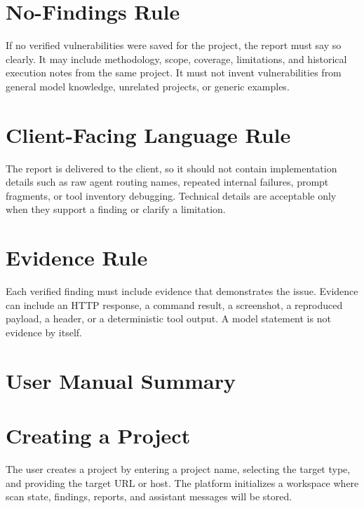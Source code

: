 \documentclass[12pt,a4paper]{report}
\begin{document}
\section*{No-Findings Rule}

If no verified vulnerabilities were saved for the project, the report must say so
clearly. It may include methodology, scope, coverage, limitations, and historical
execution notes from the same project. It must not invent vulnerabilities from general
model knowledge, unrelated projects, or generic examples.

\section*{Client-Facing Language Rule}

The report is delivered to the client, so it should not contain implementation details
such as raw agent routing names, repeated internal failures, prompt fragments, or tool
inventory debugging. Technical details are acceptable only when they support a finding
or clarify a limitation.

\section*{Evidence Rule}

Each verified finding must include evidence that demonstrates the issue. Evidence can
include an HTTP response, a command result, a screenshot, a reproduced payload, a header,
or a deterministic tool output. A model statement is not evidence by itself.

\newpage
\section{User Manual Summary}

\section*{Creating a Project}

The user creates a project by entering a project name, selecting the target type, and
providing the target URL or host. The platform initializes a workspace where scan
state, findings, reports, and assistant messages will be stored.
\end{document}
